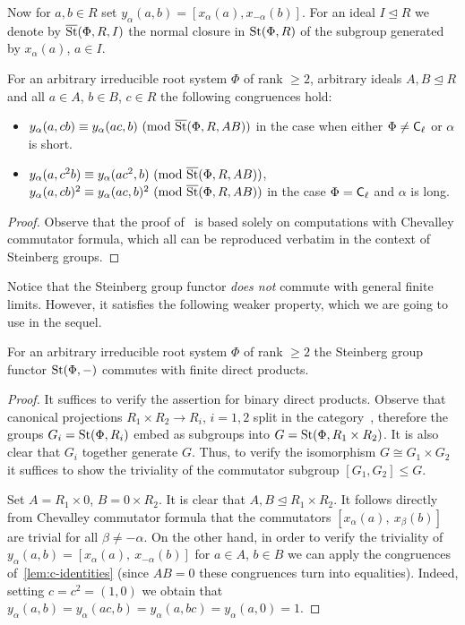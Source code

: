 \documentclass[oneside, 11pt]{amsart} \pdfoutput=1
\begin{document}
Now for $a, b \in R$ set $y_\alpha(a, b) = [x_\alpha(a), x_{-\alpha}(b)]$.
For an ideal $I \trianglelefteq R$ we denote by $\overline{\mathop{\mathrm{St}}\nolimits}(\Phi, R, I)$ the normal closure in $\mathop{\mathrm{St}}\nolimits(\Phi, R)$ of the subgroup generated by $x_\alpha(a)$, $a\in I$.

\begin{lemma} \label{lem:c-identities} For an arbitrary irreducible root system $\Phi$ of rank $\geq 2$, arbitrary ideals $A, B \trianglelefteq R$ and all $a \in A$, $b \in B$, $c \in R$ the following congruences hold:
\begin{itemize}
 \item $y_\alpha(a, cb) \equiv y_\alpha(ac, b)\ (\mathrm{mod}\ \overline{\mathop{\mathrm{St}}\nolimits}(\Phi, R, AB))$ in the case when either $\Phi \neq \mathsf{C}_{\ell}$ or $\alpha$ is short.
 \item $y_\alpha(a, c^2b) \equiv y_\alpha(ac^2, b)\ (\mathrm{mod}\ \overline{\mathop{\mathrm{St}}\nolimits}(\Phi, R, AB))$, $y_\alpha(a, cb)^2 \equiv y_\alpha(ac, b)^2\ (\mathrm{mod}\ \overline{\St}(\Phi, R, AB))$ in the case $\Phi = \mathsf{C}_{\ell}$ and $\alpha$ is long.
\end{itemize} \end{lemma}
\begin{proof}
 Observe that the proof of~\cite[Theorem~5]{VZ20} is based solely on computations with Chevalley commutator formula, which all can be reproduced verbatim in the context of Steinberg groups.
\end{proof}

Notice that the Steinberg group functor {\it does not} commute with general finite limits. However, it satisfies the following weaker property, which we are going to use in the sequel.
\begin{lemma} \label{lem:fprod} For an arbitrary irreducible root system $\Phi$ of rank $\geq 2$ the Steinberg group functor $\mathop{\mathrm{St}}\nolimits(\Phi, -)$ commutes with finite direct products. \end{lemma}
\begin{proof} 
It suffices to verify the assertion for binary direct products.
Observe that canonical projections $R_1 \times R_2 \to R_i$, $i=1,2$ split in the category~, therefore the groups $G_i = \mathop{\mathrm{St}}\nolimits(\Phi, R_i)$ embed as subgroups into $G = \mathop{\mathrm{St}}\nolimits(\Phi, R_1 \times R_2)$. It is also clear that $G_i$ together generate $G$. Thus, to verify the isomorphism $G \cong G_1 \times G_2$ it suffices to show the triviality of the commutator subgroup $[G_1, G_2] \leq G$.

Set $A = R_1\times 0$, $B = 0 \times R_2$. It is clear that $A, B \trianglelefteq R_1 \times R_2$. 
It follows directly from Chevalley commutator formula that the commutators $[x_{\alpha}(a),\ x_\beta(b)]$ are trivial for all $\beta \neq -\alpha$. On the other hand, in order to verify the triviality of $y_\alpha(a, b) = [x_{\alpha}(a),\ x_{-\alpha}(b)]$ for $a\in A$, $b\in B$ we can apply the congruences of~\cref{lem:c-identities} (since $AB=0$ these congruences turn into equalities).
Indeed, setting $c = c^2 = (1, 0)$ we obtain that $y_\alpha(a, b) = y_\alpha(ac, b) = y_\alpha(a, bc) = y_\alpha(a, 0) = 1$. \end{proof}
\end{document}
